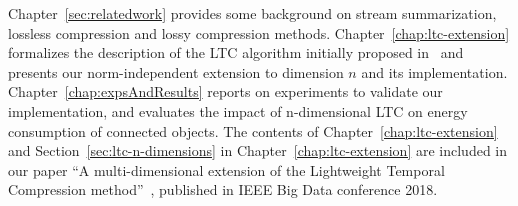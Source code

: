 

Chapter~\ref{sec:relatedwork} provides some background on stream
summarization, lossless compression and lossy compression methods.
Chapter~\ref{chap:ltc-extension} formalizes the description of the LTC
algorithm initially proposed in~\cite{schoellhammer2004lightweight} and
presents our norm-independent extension to dimension $n$ and its
implementation. Chapter~\ref{chap:expsAndResults} reports on experiments to
validate our implementation, and evaluates the impact of n-dimensional LTC
on energy consumption of connected objects.
 The contents of Chapter~\ref{chap:ltc-extension} and
Section~\ref{sec:ltc-n-dimensions} in Chapter~\ref{chap:ltc-extension} are
included in our paper ``A multi-dimensional extension of the Lightweight
Temporal Compression method''~\cite{li2018multi}, published in IEEE Big Data
conference 2018.




